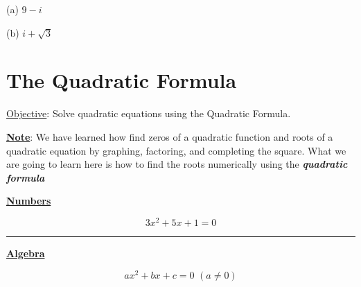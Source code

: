 \documentclass{report}
\theoremstyle{definition}
\begin{document}
\begin{minipage}[t]{0.45\linewidth}
(a) $9-i$
\end{minipage}
\hfill
\begin{minipage}[t]{0.45\linewidth}
(b) $i+\sqrt{3}$
\end{minipage}

\vfill
 \noindent{}
 \newpage

 \section{ The Quadratic Formula  }
 \setcounter{example}{0}
 \setcounter{definition}{0}
 \setcounter{youtry}{0}
 \hfill \underline{Objective}: Solve quadratic equations using the Quadratic Formula.\\
\begin{center}
	\begin{minipage}[t]{0.8\linewidth}
	\noindent \textbf{\underline{Note}}: We have learned how find zeros of a quadratic function and roots of a quadratic equation by graphing, factoring, and completing the square. What we are going to learn here is how to find the roots numerically using the \textbf{\emph{quadratic formula}}
	\end{minipage}
\end{center}
 
\begin{minipage}[t]{0.45\linewidth}
	\vspace{-7cm}
	\begin{center}
	\textbf{\underline{Numbers}}
	\end{center}\large 
	\[3x^2+5x+1=0\]
	\normalsize
\end{minipage}
\hfill
\begin{minipage}[t]{0.05cm}
	\indent\hfill\rule{0.01cm}{7cm}
\end{minipage}
\hfill
\begin{minipage}[t]{0.45\linewidth}
	\vspace{-7cm}
	\begin{center}
	\textbf{\underline{Algebra}}
	\end{center}\large 
	\[ax^2+bx+c=0 \,\, (a\neq 0) \]
	\normalsize
\end{minipage}
\end{document}
